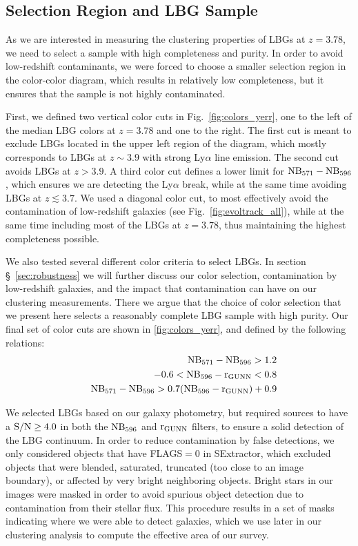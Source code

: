 \documentclass[iop, revtex4]{emulateapj}
\begin{document}
\subsection{Selection Region and LBG Sample}
\label{sec:sample}
 
As we are interested in measuring the clustering properties of LBGs at
$z=3.78$, we need to select a sample with high completeness and purity.
In order to avoid
low-redshift contaminants, we were forced to choose a smaller
selection region in the color-color diagram, which results in
relatively low completeness,
 but it ensures that the sample is not highly contaminated. 

First, we defined two vertical color cuts in Fig.~\ref{fig:colors_yerr}, one to the left of the median
LBG colors at $z=3.78$ and one to the right. The first cut is
meant to exclude LBGs located in the upper left region of the diagram, which mostly
corresponds to LBGs at $z\sim3.9$ with strong Ly$\alpha$ line
emission.
The second cut avoids LBGs at $z>3.9$.  A third color
cut defines a lower limit for $\rm NB_{571}-NB_{596}$, which
ensures we are detecting the Ly$\alpha$ break, while
at the same time avoiding LBGs at $z\lesssim3.7$. We used a diagonal color cut, to 
most effectively avoid the contamination of low-redshift galaxies (see Fig.~\ref{fig:evoltrack_all}),
while at the same time including most of the LBGs at $z=3.78$, thus maintaining
the highest completeness possible.

We also tested several different color criteria to select LBGs. In section
\S~\ref{sec:robustness} we will further discuss our color selection,
contamination by low-redshift galaxies, and the impact that contamination
can have on our clustering measurements. There we argue that the choice
of color selection that we present here selects a reasonably complete LBG sample with
high purity.  Our final set of color cuts are shown in \ref{fig:colors_yerr}, and
defined by the following relations:
\begin{eqnarray}
& & \rm NB_{571}-NB_{596}> 1.2 \nonumber \\
& & -0.6 <   \rm NB_{596}-r_{GUNN} <0.8 \nonumber \\
& & \rm NB_{571}-NB_{596} >  0.7 (NB_{596}-r_{GUNN}) + 0.9 
\label{eq:colorcut}
\end{eqnarray}

We selected LBGs based on our galaxy photometry, but required sources
to have a ${\rm S\slash N}\ge 4.0$ in both the $\rm NB_{596}$ and $\rm
r_{GUNN}$ filters, to ensure a solid detection of the LBG
continuum. 
In order to reduce contamination by false detections, we only
considered objects that have FLAGS$=0$ in SExtractor, which excluded
objects that were blended, saturated, truncated (too close to an image
boundary), or affected by very bright neighboring objects.  Bright
stars in our images were masked in order to avoid spurious object
detection due to contamination from their stellar flux. This procedure
results in a set of masks indicating where we were able to detect
galaxies, which we use later in our clustering analysis to compute the
effective area of our survey.
\end{document}
